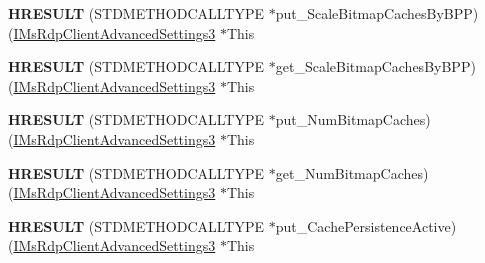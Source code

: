 \begin{DoxyCompactItemize}
\item 
\mbox{\label{struct_m_s_t_s_c_lib_1_1_i_ms_rdp_client_advanced_settings3_vtbl_a15b5d63c91672ec88790501a856740e7}} 
{\bfseries H\+R\+E\+S\+U\+LT} (S\+T\+D\+M\+E\+T\+H\+O\+D\+C\+A\+L\+L\+T\+Y\+PE $\ast$put\+\_\+\+Scale\+Bitmap\+Caches\+By\+B\+PP)(\hyperlink{interface_m_s_t_s_c_lib_1_1_i_ms_rdp_client_advanced_settings3}{I\+Ms\+Rdp\+Client\+Advanced\+Settings3} $\ast$This
\item 
\mbox{\label{struct_m_s_t_s_c_lib_1_1_i_ms_rdp_client_advanced_settings3_vtbl_a0bf9cf4b53dde74ba6637b55c27f15e6}} 
{\bfseries H\+R\+E\+S\+U\+LT} (S\+T\+D\+M\+E\+T\+H\+O\+D\+C\+A\+L\+L\+T\+Y\+PE $\ast$get\+\_\+\+Scale\+Bitmap\+Caches\+By\+B\+PP)(\hyperlink{interface_m_s_t_s_c_lib_1_1_i_ms_rdp_client_advanced_settings3}{I\+Ms\+Rdp\+Client\+Advanced\+Settings3} $\ast$This
\item 
\mbox{\label{struct_m_s_t_s_c_lib_1_1_i_ms_rdp_client_advanced_settings3_vtbl_aeb2c605259014ef8129a88c8527612e6}} 
{\bfseries H\+R\+E\+S\+U\+LT} (S\+T\+D\+M\+E\+T\+H\+O\+D\+C\+A\+L\+L\+T\+Y\+PE $\ast$put\+\_\+\+Num\+Bitmap\+Caches)(\hyperlink{interface_m_s_t_s_c_lib_1_1_i_ms_rdp_client_advanced_settings3}{I\+Ms\+Rdp\+Client\+Advanced\+Settings3} $\ast$This
\item 
\mbox{\label{struct_m_s_t_s_c_lib_1_1_i_ms_rdp_client_advanced_settings3_vtbl_a4005a2650c45dcd4fdb48c53a4341a57}} 
{\bfseries H\+R\+E\+S\+U\+LT} (S\+T\+D\+M\+E\+T\+H\+O\+D\+C\+A\+L\+L\+T\+Y\+PE $\ast$get\+\_\+\+Num\+Bitmap\+Caches)(\hyperlink{interface_m_s_t_s_c_lib_1_1_i_ms_rdp_client_advanced_settings3}{I\+Ms\+Rdp\+Client\+Advanced\+Settings3} $\ast$This
\item 
\mbox{\label{struct_m_s_t_s_c_lib_1_1_i_ms_rdp_client_advanced_settings3_vtbl_aa6fea5f06401b0c75aad2015bd76c589}} 
{\bfseries H\+R\+E\+S\+U\+LT} (S\+T\+D\+M\+E\+T\+H\+O\+D\+C\+A\+L\+L\+T\+Y\+PE $\ast$put\+\_\+\+Cache\+Persistence\+Active)(\hyperlink{interface_m_s_t_s_c_lib_1_1_i_ms_rdp_client_advanced_settings3}{I\+Ms\+Rdp\+Client\+Advanced\+Settings3} $\ast$This

\end{DoxyCompactItemize}
